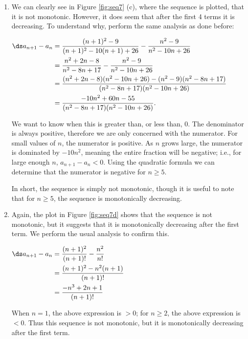 {\begin{enumerate}
\item		We can clearly see in Figure \ref{fig:seq7} (c), where the sequence is plotted, that it is not monotonic. However, it does seem that after the first 4 terms it is decreasing. To understand why, perform the same analysis as done before:

						\hfill $\ds \begin{aligned}[t]	
						a_{n+1}-a_n &= \frac{(n+1)^2-9}{(n+1)^2-10(n+1)+26} - \frac{n^2-9}{n^2-10n+26} \\		
								&= \frac{n^2+2n-8}{n^2-8n+17}-\frac{n^2-9}{n^2-10n+26}\\
								&= \frac{(n^2+2n-8)(n^2-10n+26)-(n^2-9)(n^2-8n+17)}{(n^2-8n+17)(n^2-10n+26)}\\
								&= \frac{-10n^2+60n-55}{(n^2-8n+17)(n^2-10n+26)}.
								\end{aligned}$\hfill \null		

We want to know when this is greater than, or less than, 0. The denominator is always positive, therefore we are only concerned with the numerator. For small values of $n$, the numerator is positive. As $n$ grows large, the numerator is dominated by $-10n^2$, meaning the entire fraction will be negative; i.e., for large enough $n$, $a_{n+1}-a_n < 0$. Using the quadratic formula we can determine that the numerator is  negative for $n\geq 5$. 



In short, the sequence is simply not monotonic, though it is useful to note that for $n\geq 5$, the sequence is monotonically decreasing. 

\item		Again, the plot in Figure \ref{fig:seq7d} shows that the sequence is not monotonic, but it suggests that it is monotonically decreasing after the first term. We perform the usual analysis to confirm this.

					\hfill $\ds \begin{aligned}[t]	
						a_{n+1}-a_n &= \frac{(n+1)^2}{(n+1)!} - \frac{n^2}{n!} \\
								&= \frac{(n+1)^2-n^2(n+1)}{(n+1)!} \\
								&=	\frac{-n^3+2n+1}{(n+1)!}
					\end{aligned}$\hfill \null
					
When $n=1$, the above expression is $>0$; for $n\geq 2$, the above expression is $<0$. Thus this sequence is not monotonic, but it is monotonically decreasing after the first term.
\end{enumerate}
\baselineskip
}\\


